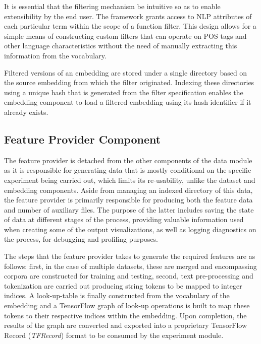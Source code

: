 \documentclass[12pt, a4paper]{report}
\theoremstyle{definition}
\theoremstyle{definition}%
\theoremstyle{definition}%
\theoremstyle{definition}%
\theoremstyle{definition}%
\theoremstyle{definition}%
\begin{document}
It is essential that the filtering mechanism be intuitive so as to enable extensibility by the end user. The framework grants access to NLP attributes of each particular term within the scope of a function filter. This design allows for a simple means of constructing custom filters that can operate on POS tags and other language characteristics without the need of manually extracting this information from the vocabulary.

Filtered versions of an embedding are stored under a single directory based on the source embedding from which the filter originated. Indexing these directories using a unique hash that is generated from the filter specification enables the embedding component to load a filtered embedding using its hash identifier if it already exists.

\subsection{Feature Provider Component}
The feature provider is detached from the other components of the data module as it is responsible for generating data that is mostly conditional on the specific experiment being carried out, which limits its re-usability, unlike the dataset and embedding components. Aside from managing an indexed directory of this data, the feature provider is primarily responsible for producing both the feature data and number of auxiliary files. The purpose of the latter includes saving the state of data at different stages of the process, providing valuable information used when creating some of the output visualizations, as well as logging diagnostics on the process, for debugging and profiling purposes.

The steps that the feature provider takes to generate the required features are as follows: first, in the case of multiple datasets, these are merged and encompassing corpora are constructed for training and testing, second, text pre-processing and tokenization are carried out producing string tokens to be mapped to integer indices. A look-up-table is finally constructed from the vocabulary of the embedding and a TensorFlow graph of look-up operations is built to map these tokens to their respective indices within the embedding. Upon completion, the results of the graph are converted and exported into a proprietary TensorFlow Record (\textit{TFRecord}) format to be consumed by the experiment module.
\end{document}
